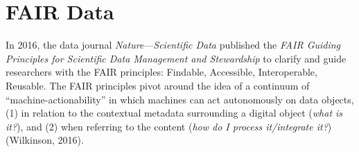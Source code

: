 \documentclass[
]{book}
\theoremstyle{definition}
\theoremstyle{definition}
\theoremstyle{definition}
\theoremstyle{definition}
\theoremstyle{remark}
\begin{document}
\hypertarget{fair-data}{%
\section{FAIR Data}\label{fair-data}}

In 2016, the data journal \emph{Nature}---\emph{Scientific Data} published the \emph{FAIR Guiding Principles for Scientific Data Management and Stewardship} to clarify and guide researchers with the FAIR principles: Findable, Accessible, Interoperable, Reusable. The FAIR principles pivot around the idea of a continuum of ``machine-actionability'' in which machines can act autonomously on data objects, (1) in relation to the contextual metadata surrounding a digital object (\emph{what is it?}), and (2) when referring to the content (\emph{how do I process it/integrate it?}) (Wilkinson, 2016).
\end{document}
